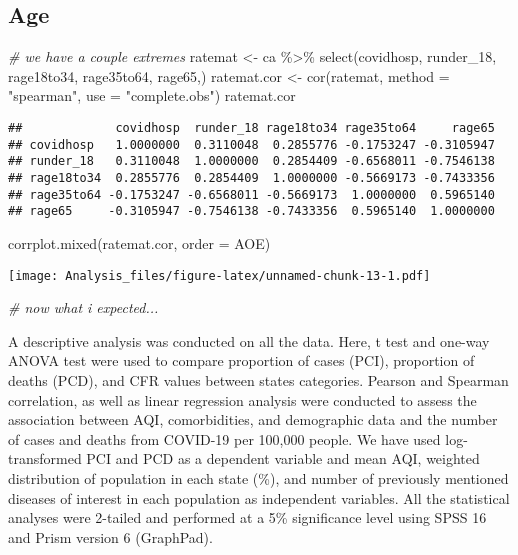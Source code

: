 \documentclass[
]{article}
\newenvironment{Shaded}{\begin{snugshade}}{\end{snugshade}}
\newcommand{\AttributeTok}[1]{\textcolor[rgb]{0.77,0.63,0.00}{#1}}
\newcommand{\CommentTok}[1]{\textcolor[rgb]{0.56,0.35,0.01}{\textit{#1}}}
\newcommand{\FunctionTok}[1]{\textcolor[rgb]{0.00,0.00,0.00}{#1}}
\newcommand{\NormalTok}[1]{#1}
\newcommand{\OtherTok}[1]{\textcolor[rgb]{0.56,0.35,0.01}{#1}}
\newcommand{\SpecialCharTok}[1]{\textcolor[rgb]{0.00,0.00,0.00}{#1}}
\newcommand{\StringTok}[1]{\textcolor[rgb]{0.31,0.60,0.02}{#1}}
\begin{document}
\hypertarget{age}{%
\subsection{Age}\label{age}}

\begin{Shaded}
\begin{Highlighting}[]
\CommentTok{\# we have a couple extremes}
\NormalTok{ratemat }\OtherTok{\textless{}{-}}\NormalTok{ ca }\SpecialCharTok{\%\textgreater{}\%} \FunctionTok{select}\NormalTok{(covidhosp, runder\_18, rage18to34, rage35to64, rage65,)}
\NormalTok{ratemat.cor }\OtherTok{\textless{}{-}} \FunctionTok{cor}\NormalTok{(ratemat,  }\AttributeTok{method =} \StringTok{"spearman"}\NormalTok{, }\AttributeTok{use =} \StringTok{"complete.obs"}\NormalTok{)}
\NormalTok{ratemat.cor}
\end{Highlighting}
\end{Shaded}

\begin{verbatim}
##             covidhosp  runder_18 rage18to34 rage35to64     rage65
## covidhosp   1.0000000  0.3110048  0.2855776 -0.1753247 -0.3105947
## runder_18   0.3110048  1.0000000  0.2854409 -0.6568011 -0.7546138
## rage18to34  0.2855776  0.2854409  1.0000000 -0.5669173 -0.7433356
## rage35to64 -0.1753247 -0.6568011 -0.5669173  1.0000000  0.5965140
## rage65     -0.3105947 -0.7546138 -0.7433356  0.5965140  1.0000000
\end{verbatim}

\begin{Shaded}
\begin{Highlighting}[]
\FunctionTok{corrplot.mixed}\NormalTok{(ratemat.cor, }\AttributeTok{order =} \StringTok{\textquotesingle{}AOE\textquotesingle{}}\NormalTok{)}
\end{Highlighting}
\end{Shaded}

\texttt{[image: Analysis\_files/figure-latex/unnamed-chunk-13-1.pdf]}

\begin{Shaded}
\begin{Highlighting}[]
\CommentTok{\# now what i expected...}
\end{Highlighting}
\end{Shaded}

A descriptive analysis was conducted on all the data. Here, t test and
one-way ANOVA test were used to compare proportion of cases (PCI),
proportion of deaths (PCD), and CFR values between states categories.
Pearson and Spearman correlation, as well as linear regression analysis
were conducted to assess the association between AQI, comorbidities, and
demographic data and the number of cases and deaths from COVID-19 per
100,000 people. We have used log-transformed PCI and PCD as a dependent
variable and mean AQI, weighted distribution of population in each state
(\%), and number of previously mentioned diseases of interest in each
population as independent variables. All the statistical analyses were
2-tailed and performed at a 5\% significance level using SPSS 16 and
Prism version 6 (GraphPad).
\end{document}
